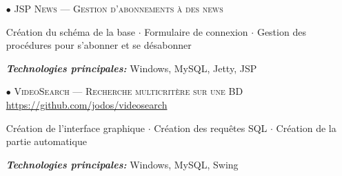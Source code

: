 \documentclass[10pt,a4paper]{moderncv}
\begin{document}
\vspace{1cm}

\begin{itemize}
		
	\item[$\bullet$] \textsc{JSP News --- Gestion d'abonnements à des news}    	
	\item[] Création du schéma de la base $\cdot$ Formulaire de connexion $\cdot$ Gestion des procédures pour s'abonner et se désabonner
	\item[] \emph{\textbf{Technologies principales:}} Windows, MySQL, Jetty, JSP
	      	      	
	\item[$\bullet$] \textsc{VideoSearch --- Recherche multicritère sur une BD} \url{https://github.com/jodos/videosearch}
	\item[] Création de l'interface graphique $\cdot$ Création des requêtes SQL $\cdot$ Création de la partie automatique     	
	\item[] \emph{\textbf{Technologies principales:}} Windows, MySQL, Swing
	      	      	
\end{itemize}

\vspace{1cm}
\end{document}
